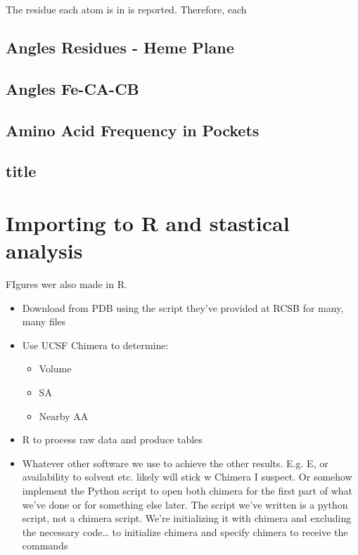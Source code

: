 		The residue each atom is in is reported. Therefore, each
		
		\subsection*{Angles Residues - Heme Plane}
		
		\subsection*{Angles Fe-CA-CB}
		
		\subsection*{Amino Acid Frequency in Pockets}
		
		\subsection*{title}
	
	
	\section*{Importing to R and stastical analysis}
	
	FIgures wer also made in R. 
	
	
	\begin{itemize}
		
		
		
		
		\item Download from PDB using the script they’ve provided at RCSB for many, many files
		
		\item Use UCSF Chimera to determine:
		\begin{itemize}
			\item Volume
			\item SA
			\item Nearby AA
		\end{itemize}
		
		\item R to process raw data and produce tables
		\item Whatever other software we use to achieve the other results. E.g. E, or availability to solvent etc. likely will stick w Chimera I suspect. Or somehow implement the Python script to open both chimera for the first part of what we’ve done or for something else later. The script we’ve written is a python script, not a chimera script. We’re initializing it with chimera and excluding the necessary code… to initialize chimera and specify chimera to receive the commands
		
	\end{itemize}